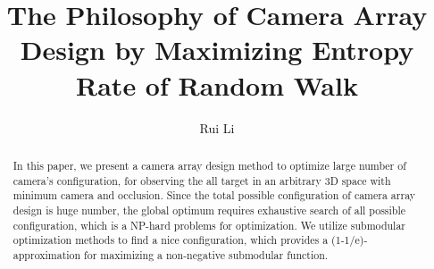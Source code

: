 \documentclass[lettersize,journal]{IEEEtran}
\begin{document}
\title{The Philosophy of Camera Array Design by Maximizing Entropy Rate of Random Walk}

\author{Rui Li}



\maketitle

\def\eg{\emph{e.g.}}
\def\Eg{\emph{E.g.}}
\def\etal{\emph{et al.}}

\newcommand\todo[1]{{\color{orange}TODO: #1}}
\newcommand\revised[1]{{\color{red}#1}}
\newcommand\idea[1]{{\color{blue}IDEA:#1}}
\newcommand\eqnref[1]{Eqn.~(\ref{#1})}
\newcommand\figref[1]{Fig.~(\ref{#1})}
\newcommand\secref[1]{Sec.~\ref{#1}}
\newcommand\tabref[1]{Tab.~\ref{#1}}

\newcommand{\T}{\mathbf{T}}
\newcommand{\svl}{\hat{\mathbf{s}}} %
\newcommand{\svg}{\mathbf{s}} %
\newcommand{\svt}{\mathbf{S}} %
\newcommand\mm[1]{\mathcal{#1}}
\newcommand\sv[1]{\mathcal{#1}}
\newcommand{\note}[1]{{\em{\textcolor{orange}{#1}}}}

\begin{abstract}
In this paper, we present a camera array design method to optimize large number of camera’s configuration, for observing the all target in an arbitrary 3D space with minimum camera and occlusion. Since the total possible configuration of camera array design is huge number, the global optimum requires exhaustive search of all possible configuration, which is a NP-hard problems for optimization. We utilize submodular optimization methods to find a nice configuration, which provides a (1-1/e)-approximation for maximizing a non-negative submodular function.
\end{abstract}





%



%
%
%
%
%
%
%
%
%
%
%
%
%
%
%	
%	
\vfill
\end{document}
